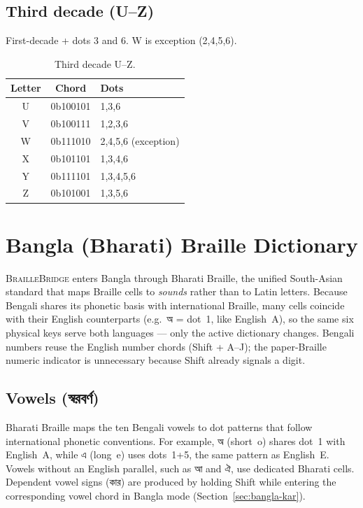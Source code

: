 \documentclass[11pt,a4paper,twoside]{article}
\newcommand{\projectname}{\textsc{BrailleBridge}}
\newcommand{\bengali}[1]{#1}
\begin{document}
\subsection{Third decade (U--Z)}
First-decade + dots 3 and 6. W is exception (2,4,5,6).

\begin{table}[H]\centering
\caption{Third decade U--Z.}\label{tab:english-third}
\begin{tabular}{c c l}\toprule
\textbf{Letter} & \textbf{Chord} & \textbf{Dots} \\\midrule
U & 0b100101 & 1,3,6 \\
V & 0b100111 & 1,2,3,6 \\
W & 0b111010 & 2,4,5,6 (exception) \\
X & 0b101101 & 1,3,4,6 \\
Y & 0b111101 & 1,3,4,5,6 \\
Z & 0b101001 & 1,3,5,6 \\\bottomrule
\end{tabular}\end{table}

\section{Bangla (Bharati) Braille Dictionary}

\projectname{} enters Bangla through Bharati Braille, the unified
South-Asian standard that maps Braille cells to \emph{sounds} rather than
to Latin letters. Because Bengali shares its phonetic basis with
international Braille, many cells coincide with their English counterparts
(e.g.\ \bengali{অ} = dot~1, like English~A), so the same six physical keys
serve both languages --- only the active dictionary changes. Bengali
numbers reuse the English number chords (Shift + A--J); the paper-Braille
numeric indicator is unnecessary because Shift already signals a digit.

\subsection{Vowels (\bengali{স্বরবর্ণ})}
Bharati Braille maps the ten Bengali vowels to dot patterns that follow
international phonetic conventions. For example, \bengali{অ} (short~o)
shares dot~1 with English~A, while \bengali{এ} (long~e) uses dots~1+5,
the same pattern as English~E. Vowels without an English parallel, such
as \bengali{আ} and \bengali{ঐ}, use dedicated Bharati cells. Dependent
vowel signs (\bengali{কার}) are produced by holding Shift while entering
the corresponding vowel chord in Bangla mode (Section~\ref{sec:bangla-kar}).
\end{document}
